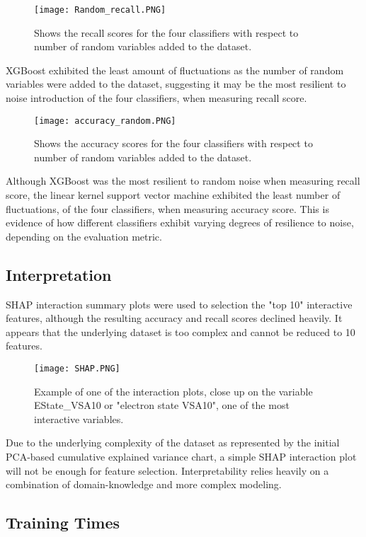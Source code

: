 \documentclass{article}
\begin{document}
\begin{itemize}
\begin{figure}[hbt!]
\texttt{[image: Random\_recall.PNG]}
\caption{Shows the recall scores for the four classifiers with respect to number of random variables added to the dataset.}
\end{figure}

XGBoost exhibited the least amount of fluctuations as the number of random variables were added to the dataset, suggesting it may be the most resilient to noise introduction of the four classifiers, when measuring recall score. 

\begin{figure}[hbt!]
\texttt{[image: accuracy\_random.PNG]}
\caption{Shows the accuracy scores for the four classifiers with respect to number of random variables added to the dataset.}
\end{figure}

Although XGBoost was the most resilient to random noise when measuring recall score, the linear kernel support vector machine exhibited the least number of fluctuations, of the four classifiers, when measuring accuracy score. This is evidence of how different classifiers exhibit varying degrees of resilience to noise, depending on the evaluation metric. 

\subsection{Interpretation}

SHAP interaction summary plots were used to selection the "top 10" interactive features, although the resulting accuracy and recall scores declined heavily. It appears that the underlying dataset is too complex and cannot be reduced to 10 features. 

\begin{figure}[hbt!]
\texttt{[image: SHAP.PNG]}
\caption{Example of one of the interaction plots, close up on the variable EState_VSA10 or "electron state VSA10", one of the most interactive variables.}
\end{figure}

Due to the underlying complexity of the dataset as represented by the initial PCA-based cumulative explained variance chart, a simple SHAP interaction plot will not be enough for feature selection. Interpretability relies heavily on a combination of domain-knowledge and more complex modeling.  


\subsection{Training Times}


\end{itemize}
\end{document}
